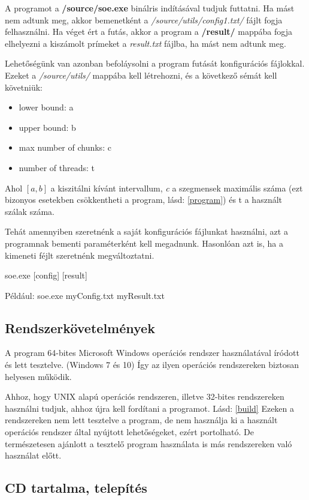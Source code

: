 \documentclass[twoside, a4paper, 12pt]{article}
\begin{document}
A programot a \textbf{/source/soe.exe} binálris indításával tudjuk futtatni. Ha mást nem adtunk meg, akkor bemenetként a \textit{/source/utils/config1.txt/} fájlt fogja felhasználni. Ha véget ért a futás, akkor a program a \textbf{/result/} mappába fogja elhelyezni a kiszámolt prímeket a \textit{result.txt} fájlba, ha mást nem adtunk meg.\par \bigskip
Lehetőségünk van azonban befoláysolni a program futását konfigurációs fájlokkal. Ezeket a \textit{/source/utils/} mappába kell létrehozni, és a következő sémát kell követniük:
\begin{itemize}
\item lower bound: a
\item upper bound: b
\item max number of chunks: c
\item number of threads: t
\end{itemize}
Ahol \([a,b]\) a kiszitálni kívánt intervallum, \textit{c} a szegmensek maximális száma (ezt bizonyos esetekben csökkentheti a program, lásd: \ref{program}) és t a használt szálak száma. \par
\bigskip
Tehát amennyiben szeretnénk a saját konfigurációs fájlunkat használni, azt a programnak bementi paraméterként kell megadnunk. Hasonlóan azt is, ha a kimeneti féjlt szeretnénk megváltoztatni. \par \bigskip
soe.exe [config] [result] \par
Például: soe.exe myConfig.txt myResult.txt

\subsection{Rendszerkövetelmények}

A program 64-bites Microsoft Windows operációs rendszer használatával íródott és lett tesztelve. (Windows 7 és 10) Így az ilyen operációs rendszereken biztosan helyesen működik. \par
Ahhoz, hogy UNIX alapú operációs rendszeren, illetve 32-bites rendszereken használni tudjuk, ahhoz újra kell fordítani a programot. Lásd: \ref{build} Ezeken a rendszereken nem lett tesztelve a program, de nem használja ki a használt operációs rendszer által nyújtott lehetőségeket, ezért portolható. De természetesen ajánlott a tesztelő program használata is más rendszereken való használat előtt.

\subsection{CD tartalma, telepítés}
\end{document}
